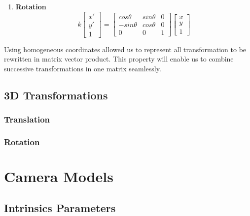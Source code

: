 \documentclass{book}
\begin{document}
\begin{enumerate}
                    \item \textbf{Rotation} \begin{equation}
                        k\begin{bmatrix}
                            x'\\ 
                            y'\\ 
                            1
                            \end{bmatrix} = 
                            \begin{bmatrix}
                            cos\theta & sin\theta & 0\\ 
                            -sin\theta & cos\theta & 0\\ 
                            0 & 0 & 1
                            \end{bmatrix}
                            \begin{bmatrix}
                            x\\ 
                            y\\ 
                            1
                            \end{bmatrix}
                    \end{equation}
                \end{enumerate}
                Using homogeneous coordinates allowed us to represent all transformation to be rewritten in matrix vector product. This property
                will enable us to combine successive transformations in one matrix seamlessly. 

            \subsection{3D Transformations}
                \subsubsection{Translation}

                \subsubsection{Rotation}

        \section{Camera Models}
            \subsection{Intrinsics Parameters}
\end{document}
